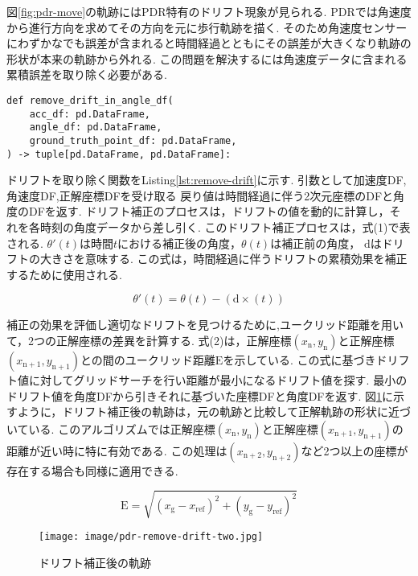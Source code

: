 
図\ref{fig:pdr-move}の軌跡にはPDR特有のドリフト現象が見られる.
PDRでは角速度から進行方向を求めてその方向を元に歩行軌跡を描く.
そのため角速度センサーにわずかなでも誤差が含まれると時間経過とともにその誤差が大きくなり軌跡の形状が本来の軌跡から外れる.
この問題を解決するには角速度データに含まれる累積誤差を取り除く必要がある.


\begin{lstlisting}[caption={ドリフト除去}, label=lst:remove-drift]
def remove_drift_in_angle_df(
    acc_df: pd.DataFrame,
    angle_df: pd.DataFrame,
    ground_truth_point_df: pd.DataFrame,
) -> tuple[pd.DataFrame, pd.DataFrame]:
\end{lstlisting}

ドリフトを取り除く関数をListing\ref{lst:remove-drift}に示す.
引数として加速度DF,角速度DF,正解座標DFを受け取る
戻り値は時間経過に伴う2次元座標のDFと角度のDFを返す.
ドリフト補正のプロセスは，ドリフトの値を動的に計算し，それを各時刻の角度データから差し引く.
このドリフト補正プロセスは，式(1)で表される.
$\theta'(t)$は時間$t$における補正後の角度，$\theta(t)$は補正前の角度，
$\mathrm{d}$はドリフトの大きさを意味する.
この式は，時間経過に伴うドリフトの累積効果を補正するために使用される.

\vspace{5mm} %

\begin{equation}
	\theta'(t) = \theta(t) - (\mathrm{d} \times (t))
\end{equation}

\vspace{5mm} %

補正の効果を評価し適切なドリフトを見つけるために,ユークリッド距離を用いて，2つの正解座標の差異を計算する.
式(2)は，正解座標$(x_{\mathrm{n}}, y_{\mathrm{n}})$と正解座標$(x_{\mathrm{n+1}}, y_{\mathrm{n+1}})$との間のユークリッド距離$\mathrm{E}$を示している.
この式に基づきドリフト値に対してグリッドサーチを行い距離が最小になるドリフト値を探す.
最小のドリフト値を角度DFから引きそれに基づいた座標DFと角度DFを返す.
図\ref{fig:pdr-remove-drift}に示すように，ドリフト補正後の軌跡は，元の軌跡と比較して正解軌跡の形状に近づいている.
このアルゴリズムでは正解座標$(x_{\mathrm{n}}, y_{\mathrm{n}})$と正解座標$(x_{\mathrm{n+1}}, y_{\mathrm{n+1}})$の距離が近い時に特に有効である.
この処理は$(x_{\mathrm{n+2}}, y_{\mathrm{n+2}})$など2つ以上の座標が存在する場合も同様に適用できる.

\vspace{5mm} %
\begin{equation}
	\mathrm{E} = \sqrt{(x_{\mathrm{g}} - x_{\mathrm{ref}})^2 + (y_{\mathrm{g}} - y_{\mathrm{ref}})^2}
\end{equation}
\vspace{5mm} %

\begin{figure}[h]
	\centering
	\texttt{[image: image/pdr-remove-drift-two.jpg]}
	\caption{ドリフト補正後の軌跡}    \label{fig:pdr-remove-drift}
\end{figure}
